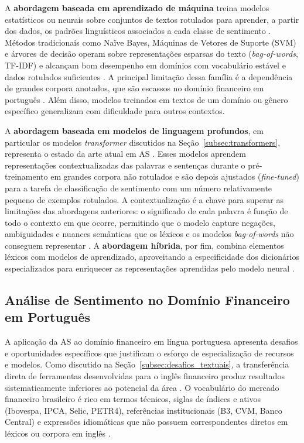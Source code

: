A \textbf{abordagem baseada em aprendizado de máquina} treina modelos estatísticos ou neurais sobre conjuntos de textos rotulados para aprender, a partir dos dados, os padrões linguísticos associados a cada classe de sentimento \cite{liu2020survey}. Métodos tradicionais como Naïve Bayes, Máquinas de Vetores de Suporte (SVM) e árvores de decisão operam sobre representações esparsas do texto (\textit{bag-of-words}, TF-IDF) e alcançam bom desempenho em domínios com vocabulário estável e dados rotulados suficientes \cite{sousa2025}. A principal limitação dessa família é a dependência de grandes corpora anotados, que são escassos no domínio financeiro em português \cite{santos2023finbert,sousa2025}. Além disso, modelos treinados em textos de um domínio ou gênero específico generalizam com dificuldade para outros contextos.

A \textbf{abordagem baseada em modelos de linguagem profundos}, em particular os modelos \textit{transformer} discutidos na Seção~\ref{subsec:transformers}, representa o estado da arte atual em AS \cite{liu2020survey,santos2023finbert}. Esses modelos aprendem representações contextualizadas das palavras e sentenças durante o pré-treinamento em grandes corpora não rotulados e são depois ajustados (\textit{fine-tuned}) para a tarefa de classificação de sentimento com um número relativamente pequeno de exemplos rotulados. A contextualização é a chave para superar as limitações das abordagens anteriores: o significado de cada palavra é função de todo o contexto em que ocorre, permitindo que o modelo capture negações, ambiguidades e nuances semânticas que os léxicos e os modelos \textit{bag-of-words} não conseguem representar \cite{jurafsky2026,devlin2019}. A \textbf{abordagem híbrida}, por fim, combina elementos léxicos com modelos de aprendizado, aproveitando a especificidade dos dicionários especializados para enriquecer as representações aprendidas pelo modelo neural \cite{kearney2014,sousa2025}.


\subsection{Análise de Sentimento no Domínio Financeiro em Português}
\label{subsec:as_financeiro_ptbr}

A aplicação da AS ao domínio financeiro em língua portuguesa apresenta desafios e oportunidades específicos que justificam o esforço de especialização de recursos e modelos. Como discutido na Seção~\ref{subsec:desafios_textuais}, a transferência direta de ferramentas desenvolvidas para o inglês financeiro produz resultados sistematicamente inferiores ao potencial da área \cite{loughran2011,santos2023finbert}. O vocabulário do mercado financeiro brasileiro é rico em termos técnicos, siglas de índices e ativos (Ibovespa, IPCA, Selic, PETR4), referências institucionais (B3, CVM, Banco Central) e expressões idiomáticas que não possuem correspondentes diretos em léxicos ou corpora em inglês \cite{sousa2025,falcao2020}.

